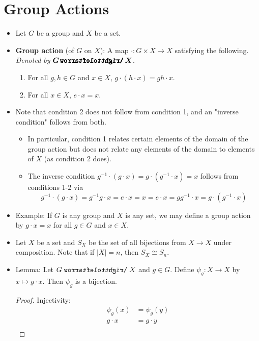 \documentclass[../notes.tex]{subfiles}
\begin{document}
\section{Group Actions}
\begin{itemize}
    \item {}Let $G$ be a group and $X$ be a set.
    \item \textbf{Group action} (of $G$ on $X$): A map $\cdot:G\times X\to X$ satisfying the following. \emph{Denoted by} $\bm{G\,\pmb{\acts}\,X}$.
    \begin{enumerate}
        \item For all $g,h\in G$ and $x\in X$, $g\cdot(h\cdot x)=gh\cdot x$.
        \item For all $x\in X$, $e\cdot x=x$.
    \end{enumerate}
    \item Note that condition 2 does not follow from condition 1, and an "inverse condition" follows from both.
    \begin{itemize}
        \item In particular, condition 1 relates certain elements of the domain of the group action but does not relate any elements of the domain to elements of $X$ (as condition 2 does).
        \item The inverse condition $g^{-1}\cdot(g\cdot x)=g\cdot(g^{-1}\cdot x)=x$ follows from conditions 1-2 via
        \begin{equation*}
            g^{-1}\cdot(g\cdot x) = g^{-1}g\cdot x
            = e\cdot x
            = x
            = e\cdot x
            = gg^{-1}\cdot x
            = g\cdot(g^{-1}\cdot x)
        \end{equation*}
    \end{itemize}
    \item Example: If $G$ is any group and $X$ is any set, we may define a group action by $g\cdot x=x$ for all $g\in G$ and $x\in X$.
    \item Let $X$ be a set and $S_X$ be the set of all bijections from $X\to X$ under composition. Note that if $|X|=n$, then $S_X\cong S_n$.
    \item Lemma: Let $G\acts X$ and $g\in G$. Define $\psi_g:X\to X$ by $x\mapsto g\cdot x$. Then $\psi_g$ is a bijection.
    \begin{proof}
        Injectivity:
        \begin{align*}
            \psi_g(x) &= \psi_g(y)\\
            g\cdot x &= g\cdot y\\

\end{align*}
\end{proof}
\end{itemize}
\end{document}
